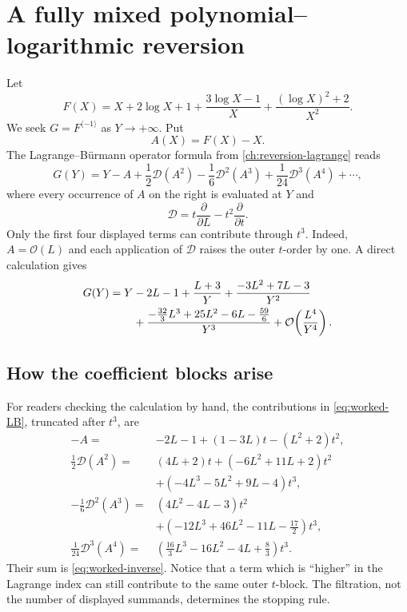 \documentclass[11pt,oneside]{book}
\theoremstyle{definition}
\theoremstyle{remark}
\newcommand{\D}{\mathcal D}
\newcommand{\bigO}{\mathcal O}
\newcommand{\compinv}{^{\langle-1\rangle}}
\begin{document}
\section{A fully mixed polynomial--logarithmic reversion}
Let
\begin{equation}\label{eq:worked-F}
 F(X)=X+2\log X+1
 +\frac{3\log X-1}{X}
 +\frac{(\log X)^2+2}{X^2}.
\end{equation}
We seek $G=F\compinv$ as $Y\to+\infty$. Put
\[
 A(X)=F(X)-X.
\]
The Lagrange--B\"urmann operator formula from
\cref{ch:reversion-lagrange} reads
\begin{equation}\label{eq:worked-LB}
 G(Y)=Y-A+\frac12\D(A^2)-\frac16\D^2(A^3)
      +\frac1{24}\D^3(A^4)+\cdots ,
\end{equation}
where every occurrence of $A$ on the right is evaluated at $Y$ and
\[
 \D=t\frac{\partial}{\partial L}
       -t^2\frac{\partial}{\partial t}.
\]
Only the first four displayed terms can contribute through $t^3$. Indeed,
$A=\bigO(L)$ and each application of $\D$ raises the outer $t$-order by one.
A direct calculation gives
\begin{align}
 G(Y)=Y&-2L-1+\frac{L+3}{Y}
 +\frac{-3L^2+7L-3}{Y^2}\notag\\
 &+\frac{-\frac{32}{3}L^3+25L^2-6L-\frac{59}{6}}{Y^3}
 +\bigO\!\left(\frac{L^4}{Y^4}\right).
 \label{eq:worked-inverse}
\end{align}

\subsection{How the coefficient blocks arise}
For readers checking the calculation by hand, the contributions in
\eqref{eq:worked-LB}, truncated after $t^3$, are
\begin{align*}
 -A={}&-2L-1+(1-3L)t-(L^2+2)t^2,\\
 \frac12\D(A^2)={}&(4L+2)t+(-6L^2+11L+2)t^2\\
 &+(-4L^3-5L^2+9L-4)t^3,\\
 -\frac16\D^2(A^3)={}&(4L^2-4L-3)t^2\\
 &+(-12L^3+46L^2-11L-\tfrac{17}{2})t^3,\\
 \frac1{24}\D^3(A^4)={}&
 (\tfrac{16}{3}L^3-16L^2-4L+\tfrac83)t^3.
\end{align*}
Their sum is \eqref{eq:worked-inverse}. Notice that a term which is
``higher'' in the Lagrange index can still contribute to the same outer
$t$-block. The filtration, not the number of displayed summands, determines
the stopping rule.
\end{document}
